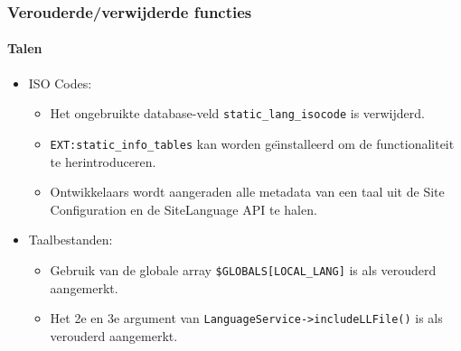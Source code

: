 \begin{frame}[fragile]
	\frametitle{Verouderde/verwijderde functies}
	\framesubtitle{Talen}

	\begin{itemize}
		\item ISO Codes:

			\begin{itemize}
				\item Het ongebruikte database-veld \texttt{static\_lang\_isocode} is verwijderd.
				\item \texttt{EXT:static\_info\_tables} kan worden ge\"{\i}nstalleerd om de functionaliteit te herintroduceren.
				\item Ontwikkelaars wordt aangeraden alle metadata van een taal uit de Site Configuration en de SiteLanguage API te halen.
			\end{itemize}

		\item Taalbestanden:

			\begin{itemize}
				\item Gebruik van de globale array \texttt{\$GLOBALS[LOCAL\_LANG]} is als verouderd aangemerkt.
				\item Het 2e en 3e argument van \texttt{LanguageService->includeLLFile()} is als verouderd aangemerkt.
			\end{itemize}

	\end{itemize}

\end{frame}


